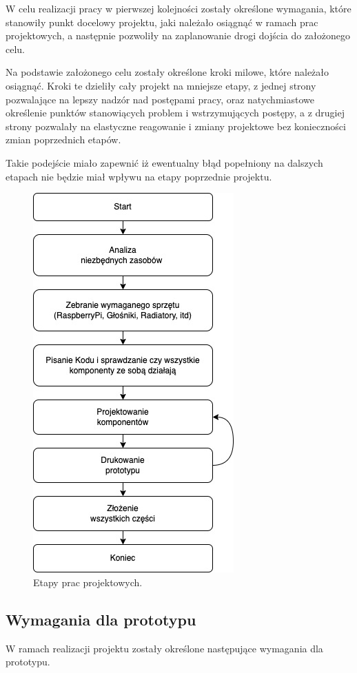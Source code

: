 \documentclass[a4paper,12pt,reqno]{article}
\begin{document}
W celu realizacji pracy w pierwszej kolejności zostały określone wymagania, które stanowiły punkt docelowy projektu, jaki należało osiągnąć w ramach prac projektowych, a następnie pozwoliły na zaplanowanie drogi dojścia do założonego celu.

Na podstawie założonego celu zostały określone kroki milowe, które należało osiągnąć. Kroki te dzieliły cały projekt na mniejsze etapy, z jednej strony pozwalające na lepszy nadzór nad postępami pracy, oraz natychmiastowe określenie punktów stanowiących problem i wstrzymujących postępy, a z drugiej strony pozwalały na elastyczne reagowanie i zmiany projektowe bez konieczności zmian poprzednich etapów.

Takie podejście miało zapewnić iż ewentualny błąd popełniony na dalszych etapach nie będzie miał wpływu na etapy poprzednie projektu.

\begin{figure}[H]%
\centering
\includegraphics[width=0.5\columnwidth]{imgs/etapy.drawio.jpg}
\caption{Etapy prac projektowych. \label{etapypracy}}
\quad
\end{figure}

\subsection{Wymagania dla prototypu}

W ramach realizacji projektu zostały określone następujące wymagania dla prototypu.
\end{document}
